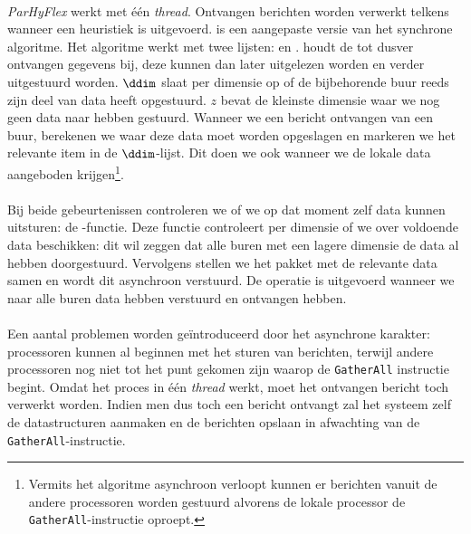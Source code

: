 
\paragraph{}
\emph{ParHyFlex} werkt met \'e\'en \emph{thread}. Ontvangen berichten worden verwerkt telkens wanneer een heuristiek is uitgevoerd.  is een aangepaste versie van het synchrone algoritme. Het algoritme werkt met twee lijsten: \dres en \ddim. \dres houdt de tot dusver ontvangen gegevens bij, deze kunnen dan later uitgelezen worden en verder uitgestuurd worden. $\ddim$ slaat per dimensie op of de bijbehorende buur reeds zijn deel van data heeft opgestuurd. $z$ bevat de kleinste dimensie waar we nog geen data naar hebben gestuurd. Wanneer we een bericht ontvangen van een buur, berekenen we waar deze data moet worden opgeslagen en markeren we het relevante item in de $\ddim$-lijst. Dit doen we ook wanneer we de lokale data aangeboden krijgen\footnote{Vermits het algoritme asynchroon verloopt kunnen er berichten vanuit de andere processoren worden gestuurd alvorens de lokale processor de \texttt{GatherAll}-instructie oproept.}.

\paragraph{}
Bij beide gebeurtenissen controleren we of we op dat moment zelf data kunnen uitsturen: de \pzedt{}-functie. Deze functie controleert per dimensie of we over voldoende data beschikken: dit wil zeggen dat alle buren met een lagere dimensie de data al hebben doorgestuurd. Vervolgens stellen we het pakket met de relevante data samen en wordt dit asynchroon verstuurd. De operatie is uitgevoerd wanneer we naar alle buren data hebben verstuurd en ontvangen hebben.

\paragraph{}
Een aantal problemen worden ge\"introduceerd door het asynchrone karakter: processoren kunnen al beginnen met het sturen van berichten, terwijl andere processoren nog niet tot het punt gekomen zijn waarop de \texttt{GatherAll} instructie begint. Omdat het proces in \'e\'en \emph{thread} werkt, moet het ontvangen bericht toch verwerkt worden. Indien men dus toch een bericht ontvangt zal het systeem zelf de datastructuren aanmaken en de berichten opslaan in afwachting van de \texttt{GatherAll}-instructie.

